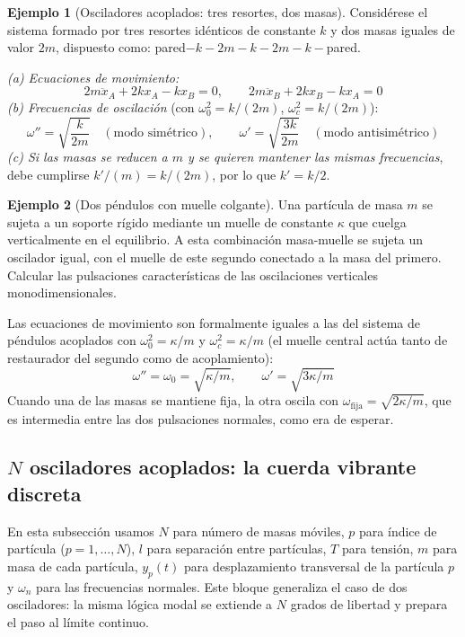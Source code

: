 \documentclass[12pt, a4paper]{article}
\theoremstyle{plain}
\theoremstyle{definition}
\newtheorem{ejemplo}{Ejemplo}[section]
\theoremstyle{remark}
\begin{document}
\begin{ejemplo}[Osciladores acoplados: tres resortes, dos masas]
Considérese el sistema formado por tres resortes idénticos de constante $k$ y dos masas
iguales de valor $2m$, dispuesto como: pared$-k-2m-k-2m-k-$pared.

\textit{(a) Ecuaciones de movimiento:}
\begin{equation}
  2m\ddot{x}_A + 2kx_A - kx_B = 0,\qquad
  2m\ddot{x}_B + 2kx_B - kx_A = 0
\end{equation}
\textit{(b) Frecuencias de oscilación} (con $\omega_0^2 = k/(2m)$, $\omega_c^2 = k/(2m)$):
\begin{equation}
  \omega'' = \sqrt{\frac{k}{2m}}\quad (\text{modo simétrico}),\qquad
  \omega'  = \sqrt{\frac{3k}{2m}}\quad (\text{modo antisimétrico})
\end{equation}
\textit{(c) Si las masas se reducen a $m$ y se quieren mantener las mismas frecuencias},
debe cumplirse $k'/(m) = k/(2m)$, por lo que $k' = k/2$.
\end{ejemplo}

\begin{ejemplo}[Dos péndulos con muelle colgante]
Una partícula de masa $m$ se sujeta a un soporte rígido mediante un muelle de constante
$\kappa$ que cuelga verticalmente en el equilibrio. A esta combinación masa-muelle se
sujeta un oscilador igual, con el muelle de este segundo conectado a la masa del primero.
Calcular las pulsaciones características de las oscilaciones verticales monodimensionales.

Las ecuaciones de movimiento son formalmente iguales a las del sistema de péndulos
acoplados con $\omega_0^2 = \kappa/m$ y $\omega_c^2 = \kappa/m$ (el muelle central actúa
tanto de restaurador del segundo como de acoplamiento):
\begin{equation}
  \omega'' = \omega_0 = \sqrt{\kappa/m},\qquad
  \omega'  = \sqrt{3\kappa/m}
\end{equation}
Cuando una de las masas se mantiene fija, la otra oscila con
$\omega_{\text{fija}} = \sqrt{2\kappa/m}$, que es intermedia entre las dos pulsaciones
normales, como era de esperar.
\end{ejemplo}

\subsection{\texorpdfstring{$N$}{N} osciladores acoplados: la cuerda vibrante discreta}

En esta subsección usamos $N$ para número de masas móviles, $p$ para índice de partícula
($p=1,\dots,N$), $l$ para separación entre partículas, $T$ para tensión, $m$ para masa de cada
partícula, $y_p(t)$ para desplazamiento transversal de la partícula $p$ y $\omega_n$ para las
frecuencias normales.
Este bloque generaliza el caso de dos osciladores: la misma lógica modal se extiende a
$N$ grados de libertad y prepara el paso al límite continuo.
\end{document}
